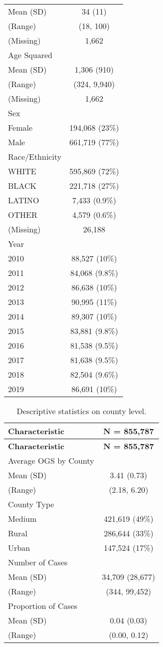 \documentclass[
  letterpaper,
  DIV=11,
  numbers=noendperiod]{scrartcl}
\begin{document}
\begin{longtable}[]{@{}lc@{}}
Mean (SD) & 34 (11) \\
(Range) & (18, 100) \\
(Missing) & 1,662 \\
Age Squared & \\
Mean (SD) & 1,306 (910) \\
(Range) & (324, 9,940) \\
(Missing) & 1,662 \\
Sex & \\
Female & 194,068 (23\%) \\
Male & 661,719 (77\%) \\
Race/Ethnicity & \\
WHITE & 595,869 (72\%) \\
BLACK & 221,718 (27\%) \\
LATINO & 7,433 (0.9\%) \\
OTHER & 4,579 (0.6\%) \\
(Missing) & 26,188 \\
Year & \\
2010 & 88,527 (10\%) \\
2011 & 84,068 (9.8\%) \\
2012 & 86,638 (10\%) \\
2013 & 90,995 (11\%) \\
2014 & 89,307 (10\%) \\
2015 & 83,881 (9.8\%) \\
2016 & 81,538 (9.5\%) \\
2017 & 81,638 (9.5\%) \\
2018 & 82,504 (9.6\%) \\
2019 & 86,691 (10\%) \\
\end{longtable}

\hypertarget{tbl-county-descriptives}{}
\begin{longtable}[]{@{}lc@{}}
\caption{\label{tbl-county-descriptives}Descriptive statistics on county
level.}\tabularnewline
\toprule\noalign{}
\textbf{Characteristic} & \textbf{N = 855,787} \\
\midrule\noalign{}
\endfirsthead
\toprule\noalign{}
\textbf{Characteristic} & \textbf{N = 855,787} \\
\midrule\noalign{}
\endhead
\bottomrule\noalign{}
\endlastfoot
Average OGS by County & \\
Mean (SD) & 3.41 (0.73) \\
(Range) & (2.18, 6.20) \\
County Type & \\
Medium & 421,619 (49\%) \\
Rural & 286,644 (33\%) \\
Urban & 147,524 (17\%) \\
Number of Cases & \\
Mean (SD) & 34,709 (28,677) \\
(Range) & (344, 99,452) \\
Proportion of Cases & \\
Mean (SD) & 0.04 (0.03) \\
(Range) & (0.00, 0.12) \\
\end{longtable}
\end{document}
